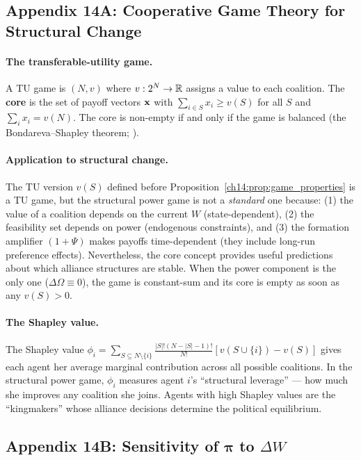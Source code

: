 \documentclass[../structural_economics_book.tex]{subfiles}
\begin{document}
\subsection*{Appendix 14A: Cooperative Game Theory for Structural Change}
\label{ch14:app:cooperative}

\paragraph{The transferable-utility game.} A TU game is $(N, v)$ where $v: 2^N \to \mathbb{R}$ assigns a value to each coalition. The \textbf{core} is the set of payoff vectors $\mathbf{x}$ with $\sum_{i \in S} x_i \geq v(S)$ for all $S$ and $\sum_i x_i = v(N)$. The core is non-empty if and only if the game is balanced (the Bondareva--Shapley theorem; \citealp{bondareva1963some,shapley1967balanced}).

\paragraph{Application to structural change.} The TU version $v(S)$ defined before Proposition~\ref{ch14:prop:game_properties} is a TU game, but the structural power game is not a \emph{standard} one because: (1) the value of a coalition depends on the current $W$ (state-dependent), (2) the feasibility set depends on power (endogenous constraints), and (3) the formation amplifier $(1+\Psi)$ makes payoffs time-dependent (they include long-run preference effects). Nevertheless, the core concept provides useful predictions about which alliance structures are stable. When the power component is the only one ($\Delta\Omega \equiv 0$), the game is constant-sum and its core is empty as soon as any $v(S) > 0$.

\paragraph{The Shapley value.} The Shapley value $\phi_i = \sum_{S \subseteq N \setminus \{i\}} \frac{|S|!(N-|S|-1)!}{N!}[v(S \cup \{i\}) - v(S)]$ gives each agent her average marginal contribution across all possible coalitions. In the structural power game, $\phi_i$ measures agent $i$'s ``structural leverage'' --- how much she improves any coalition she joins. Agents with high Shapley values are the ``kingmakers'' whose alliance decisions determine the political equilibrium.


\subsection*{Appendix 14B: Sensitivity of $\boldsymbol{\pi}$ to $\Delta W$}
\label{ch14:app:sensitivity}
\end{document}
